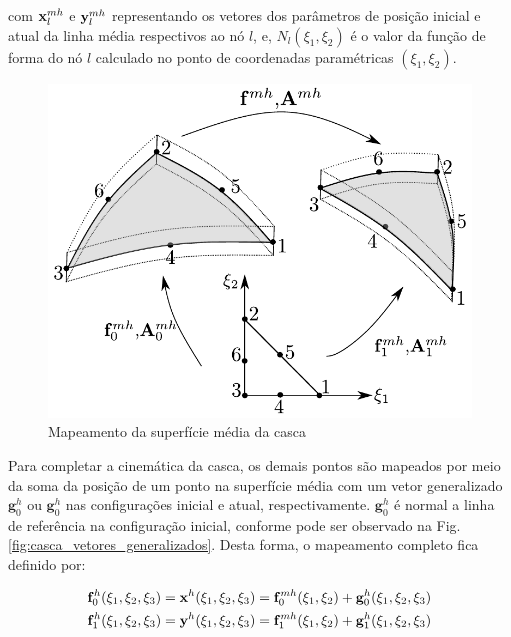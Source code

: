 \documentclass[tese_patricia]{subfiles}
\begin{document}
\noindent com $\mathbf{x}_{l}^{mh}$ e $\mathbf{y}_{l}^{mh}$ representando os vetores dos parâmetros de posição inicial e atual da linha média respectivos ao nó $l$, e, $N_{l} (\xi_{1},\xi_{2})$ é o valor da função de forma do nó $l$ calculado no ponto de coordenadas paramétricas $(\xi_{1},\xi_{2})$.

\begin{figure}[htb!]
	\centering
	\includegraphics[scale=0.8,trim=0cm 0.0cm 0cm 0cm, clip=true]{Imagens/Cap4/casca_super_media.pdf}	
	\caption{Mapeamento da superfície média da casca}
	\label{fig:casca:map_super_media}
\end{figure}

Para completar a cinemática da casca, os demais pontos são mapeados por meio da soma da posição de um ponto na superfície média com um vetor generalizado $\mathbf{g}^{h}_{0}$ ou $\mathbf{g}^{h}_{0}$ nas configurações inicial e atual, respectivamente.  $\mathbf{g}^{h}_{0}$ é normal a linha de referência na configuração inicial, conforme pode ser observado na Fig. \ref{fig:casca_vetores_generalizados}. Desta forma, o mapeamento completo fica definido por:

\begin{align}
\mathbf{f}^{h}_{0}(\xi_{1},\xi_{2},\xi_{3}) = \mathbf{x}^{h}(\xi_{1},\xi_{2},\xi_{3}) = \mathbf{f}^{mh}_{0}(\xi_{1},\xi_{2}) + \mathbf{g}^{h}_{0} (\xi_{1},\xi_{2}, \xi_{3}) \label{eq:fmap0}\\
\mathbf{f}^{h}_{1}(\xi_{1},\xi_{2},\xi_{3}) = \mathbf{y}^{h}(\xi_{1},\xi_{2},\xi_{3}) = \mathbf{f}^{mh}_{1}(\xi_{1},\xi_{2}) + \mathbf{g}^{h}_{1} (\xi_{1},\xi_{2}, \xi_{3})  \label{eq:fmap1}
\end{align}
\end{document}
